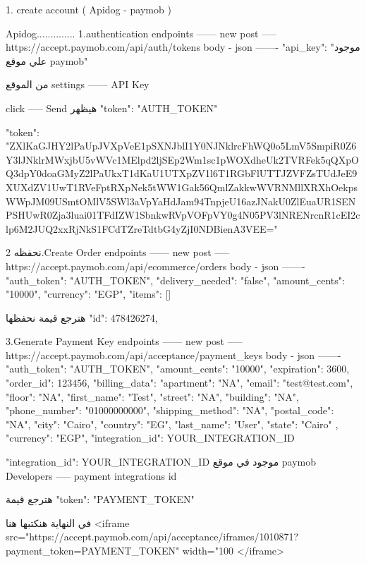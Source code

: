 1. create account ( Apidog  - paymob )

Apidog..............
1.authentication
endpoints ------ new
post  ----- https://accept.paymob.com/api/auth/tokens
body - json ------- {
  "api_key": "موجود علي موقع paymob"
}


من الموقع
settings ------ API Key

click ----- Send
 هيظهر {
  "token": "AUTH_TOKEN"
}



   "token": "ZXlKaGJHY2lPaUpJVXpVeE1pSXNJblI1Y0NJNklrcFhWQ0o5LmV5SmpiR0Z6Y3lJNklrMWxjbU5vWVc1MElpd2ljSEp2Wm1sc1pWOXdheUk2TVRFek5qQXpOQ3dpY0doaGMyZ2lPaUkxT1dKaU1UTXpZV1l6T1RGbFlUTTJZVFZsTUdJeE9XUXdZV1UwT1RVeFptRXpNek5tWW1Gak56QmlZakkwWVRNMllXRXhOekpsWWpJM09USmtOMlV5SWl3aVpYaHdJam94TnpjeU16azJNakU0ZlEuaUR1SENPSHUwR0Zja3luai01TFdIZW1SbnkwRVpVOFpVY0g4N05PV3lNRENrcnR1cEI2clp6M2JUQ2xxRjNkS1FCdTZreTdtbG4yZjI0NDBienA3VEE="




نحفظه 
2.Create Order
endpoints ------ new
post  ----- https://accept.paymob.com/api/ecommerce/orders
body - json ------- {
  "auth_token": "AUTH_TOKEN",
  "delivery_needed": "false",
  "amount_cents": "10000",
  "currency": "EGP",
  "items": []
}

هترجع قيمة نحفظها 
{
    "id": 478426274,
}




3.Generate Payment Key
endpoints ------ new
post  ----- https://accept.paymob.com/api/acceptance/payment_keys
body - json ------- {
  "auth_token": "AUTH_TOKEN",
  "amount_cents": "10000",
  "expiration": 3600,
  "order_id": 123456,
  "billing_data": {
    "apartment": "NA",
    "email": "test@test.com",
    "floor": "NA",
    "first_name": "Test",
    "street": "NA",
    "building": "NA",
    "phone_number": "01000000000",
    "shipping_method": "NA",
    "postal_code": "NA",
    "city": "Cairo",
    "country": "EG",
    "last_name": "User",
    "state": "Cairo"
  },
  "currency": "EGP",
  "integration_id": YOUR_INTEGRATION_ID
}

"integration_id": YOUR_INTEGRATION_ID
موجود في موقع   paymob 
Developers  ----- payment integrations 
id 

هترجع قيمة {
  "token": "PAYMENT_TOKEN"
} 


في النهاية هنكتبها هنا 
<iframe 
src="https://accept.paymob.com/api/acceptance/iframes/1010871?payment_token=PAYMENT_TOKEN"
width="100%
</iframe>


